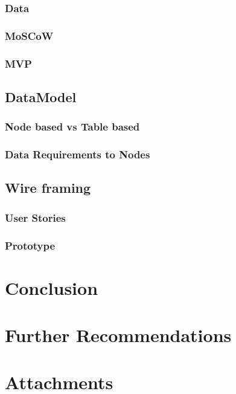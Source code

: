 \documentclass[15pt]{article}
\begin{document}
		\subsubsection{Data}
		\subsubsection{MoSCoW}
		\subsubsection{MVP}
	\subsection{DataModel}
		\subsubsection{Node based vs Table based}
		\subsubsection{Data Requirements to Nodes}
	\subsection{Wire framing}
		\subsubsection{User Stories}
		\subsubsection{Prototype}

\section{Conclusion}

\section{Further Recommendations}

\section{Attachments}


\end{document}
